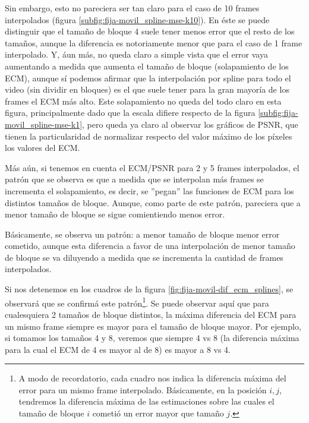 \par Sin embargo, esto no pareciera ser tan claro para el caso de 10 frames
interpolados (figura \ref{subfig:fija-movil_spline-mse-k10}). En \'este se puede
distinguir que el tama\~no de bloque 4 suele tener menos error que el resto de
los tama\~nos, aunque la diferencia es notoriamente menor que para el caso de
1 frame interpolado. Y, \'aun m\'as, no queda claro a simple vista que el error
vaya aumentando a medida que aumenta el tama\~no de bloque (solapamiento de los
ECM), aunque s\'i podemos afirmar que la interpolaci\'on por spline para todo
el video (sin dividir en bloques) es el que suele tener para la gran mayor\'ia
de los frames el ECM m\'as alto. Este solapamiento no queda del todo claro en
esta figura, principalmente dado que la escala difiere respecto de la figura
\ref{subfig:fija-movil_spline-mse-k1}, pero queda ya claro al observar los
gr\'aficos de PSNR, que tienen la particularidad de normalizar respecto del
valor m\'aximo de los p\'ixeles los valores del ECM.

\par M\'as a\'un, si tenemos en cuenta el ECM/PSNR para 2 y 5 frames interpolados,
el patr\'on que se observa es que a medida que se interpolan m\'as frames se
incrementa el solapamiento, es decir, se ''pegan'' las funciones de ECM para
los distintos tama\~nos de bloque. Aunque, como parte de este patr\'on, pareciera
que a menor tama\~no de bloque se sigue comientiendo menos error.

\par B\'asicamente, se observa un patr\'on: a menor tama\~no de bloque menor
error cometido, aunque esta diferencia a favor de una interpolaci\'on de menor
tama\~no de bloque se va diluyendo a medida que se incrementa la cantidad de
frames interpolados.

\par Si nos detenemos en los cuadros de la figura
\ref{fig:fija-movil-dif_ecm_splines}, se observar\'a que se confirm\'a este
patr\'on\footnote{A modo de recordatorio, cada cuadro nos indica la diferencia
m\'axima del error para un mismo frame interpolado. B\'asicamente, en la
posici\'on $i,j$, tendremos la diferencia m\'axima de las estimaciones sobre
las cuales el tama\~no de bloque $i$ cometi\'o un error mayor que tama\~no
$j$.}. Se puede observar aqu\'i que para cualesquiera 2 tama\~nos de bloque
distintos, la m\'axima diferencia del ECM para un mismo frame siempre es mayor
para el tama\~no de bloque mayor. Por ejemplo, si tomamos los tama\~nos 4 y 8,
veremos que siempre 4 vs 8 (la diferencia m\'axima para la cual el ECM de 4 es
mayor al de 8) es mayor a 8 vs 4.

